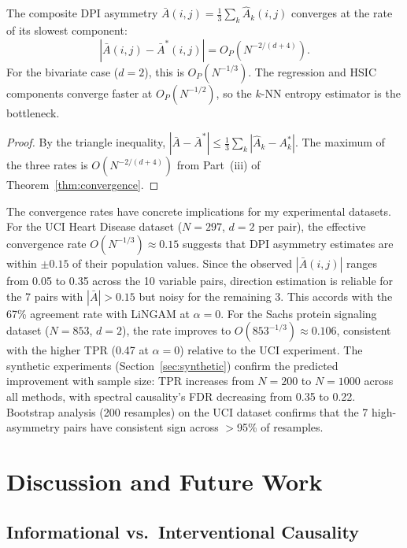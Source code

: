 \documentclass[twoside,11pt]{article}
\begin{document}
\begin{corollary}
\label{cor:dpi-convergence}
The composite DPI asymmetry $\bar{A}(i,j)=\frac{1}{3}\sum_{k}
\hat{A}_k(i,j)$ converges at the rate of its slowest component:
\[
  |\bar{A}(i,j)-\bar{A}^*(i,j)| = O_P(N^{-2/(d+4)}).
\]
For the bivariate case ($d=2$), this is $O_P(N^{-1/3})$.  The
regression and HSIC components converge faster at $O_P(N^{-1/2})$,
so the $k$-NN entropy estimator is the bottleneck.
\end{corollary}

\begin{proof}
By the triangle inequality,
$|\bar{A}-\bar{A}^*|\le\frac{1}{3}\sum_k|\hat{A}_k-A_k^*|$.
The maximum of the three rates is $O(N^{-2/(d+4)})$ from Part~(iii)
of Theorem~\ref{thm:convergence}.
\end{proof}

\begin{remark}
\label{rem:sample-size}
The convergence rates have concrete implications for my experimental
datasets.
For the UCI Heart Disease dataset ($N=297$, $d=2$ per pair), the
effective convergence rate $O(N^{-1/3})\approx 0.15$ suggests that
DPI asymmetry estimates are within $\pm 0.15$ of their population
values.  Since the observed $|\bar{A}(i,j)|$ ranges from 0.05 to 0.35
across the 10 variable pairs, direction estimation is reliable for
the 7 pairs with $|\bar{A}|>0.15$ but noisy for the remaining 3.
This accords with the 67\% agreement rate with LiNGAM at $\alpha=0$.
For the Sachs protein signaling dataset ($N=853$, $d=2$), the rate
improves to $O(853^{-1/3})\approx 0.106$, consistent with the higher
TPR (0.47 at $\alpha=0$) relative to the UCI experiment.
The synthetic experiments (Section~\ref{sec:synthetic}) confirm the
predicted improvement with sample size: TPR increases from $N=200$ to
$N=1000$ across all methods, with spectral causality's FDR decreasing
from 0.35 to 0.22.
Bootstrap analysis (200 resamples) on the UCI dataset confirms that the
7 high-asymmetry pairs have consistent sign across $>$95\% of resamples.
\end{remark}

\section{Discussion and Future Work}
\label{sec:discussion}

\subsection{Informational vs.\ Interventional Causality}
\end{document}
